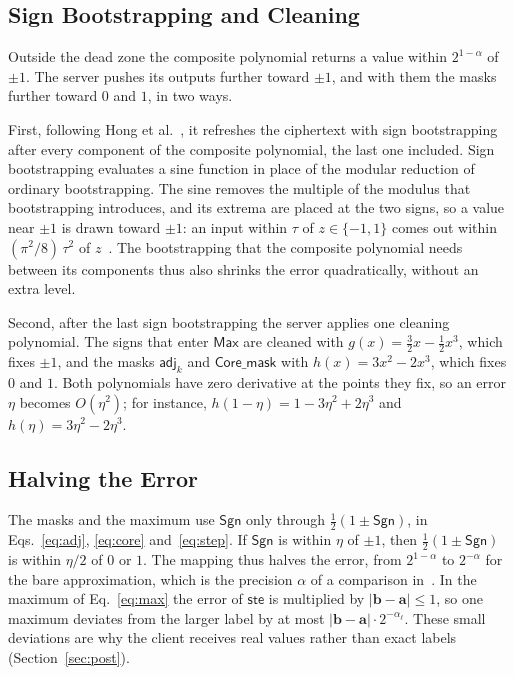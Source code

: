 \subsection{Sign Bootstrapping and Cleaning}
\label{app:signboot}

Outside the dead zone the composite polynomial returns a value within
$2^{1-\alpha}$ of $\pm 1$. The server pushes its outputs further toward
$\pm 1$, and with them the masks further toward $0$ and $1$, in two
ways.

First, following Hong et al.~\cite{hong2026white}, it refreshes the
ciphertext with sign bootstrapping after every component of the
composite polynomial, the last one included. Sign bootstrapping evaluates
a sine function in place of the modular reduction of ordinary
bootstrapping. The sine removes the multiple of the modulus that
bootstrapping introduces, and its extrema are placed at the two signs, so
a value near $\pm 1$ is drawn toward $\pm 1$: an input within $\tau$ of
$z \in \{-1, 1\}$ comes out within $(\pi^2/8)\,\tau^2$ of
$z$~\cite[Thm.~1]{hong2026white}. The bootstrapping that the composite
polynomial needs between its components thus also shrinks the error
quadratically, without an extra level.

Second, after the last sign bootstrapping the server applies one cleaning
polynomial. The signs that enter $\mathsf{Max}$ are cleaned with
$g(x) = \tfrac{3}{2}x - \tfrac{1}{2}x^3$, which
fixes $\pm 1$, and the masks $\mathsf{adj}_k$ and $\mathsf{Core\_mask}$
with $h(x) = 3x^2 - 2x^3$, which fixes $0$ and
$1$. Both polynomials have zero derivative at the points they fix, so an
error $\eta$ becomes $O(\eta^2)$; for instance,
$h(1-\eta) = 1 - 3\eta^2 + 2\eta^3$ and $h(\eta) = 3\eta^2 - 2\eta^3$.

\subsection{Halving the Error}
\label{app:error}

The masks and the maximum use $\mathsf{Sgn}$ only through
$\tfrac{1}{2}(1 \pm \mathsf{Sgn})$, in Eqs.~\eqref{eq:adj},
\eqref{eq:core} and~\eqref{eq:step}. If $\mathsf{Sgn}$ is within $\eta$
of $\pm 1$, then $\tfrac{1}{2}(1 \pm \mathsf{Sgn})$ is within $\eta/2$ of
$0$ or $1$. The mapping thus halves the error, from $2^{1-\alpha}$ to
$2^{-\alpha}$ for the bare approximation, which is the precision $\alpha$
of a comparison in~\cite{lee2021minimax}. In the maximum of
Eq.~\eqref{eq:max} the error of $\mathsf{ste}$ is multiplied by
$|\mathbf{b} - \mathbf{a}| \le 1$, so one maximum deviates from the
larger label by at most $|\mathbf{b} - \mathbf{a}| \cdot
2^{-\alpha_\ell}$. These small deviations are why the client receives
real values rather than exact labels (Section~\ref{sec:post}).

